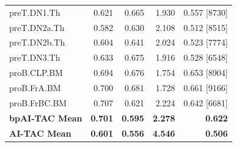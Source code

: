 \begin{longtable}[c]{lrrrr}
preT.DN1.Th & 0.621 & 0.665 & 1.930 & 0.557 [8730]  \\
preT.DN2a.Th & 0.582 & 0.630 & 2.108 & 0.512 [8515]  \\
preT.DN2b.Th & 0.604 & 0.641 & 2.024 & 0.523 [7774]  \\
preT.DN3.Th & 0.633 & 0.675 & 1.916 & 0.528 [6548]  \\
proB.CLP.BM & 0.694 & 0.676 & 1.754 & 0.653 [8904]  \\
proB.FrA.BM & 0.700 & 0.681 & 1.728 & 0.661 [9166]  \\
proB.FrBC.BM & 0.707 & 0.621 & 2.224 & 0.642 [6681]  \\
\hline
\textbf{bpAI-TAC Mean} & \textbf{0.701} & \textbf{0.595} & \textbf{2.278} & \textbf{0.622} \\
\hline
\textbf{AI-TAC Mean} & \textbf{0.601} & \textbf{0.556} & \textbf{4.546} & \textbf{0.506} \\
\end{longtable}
